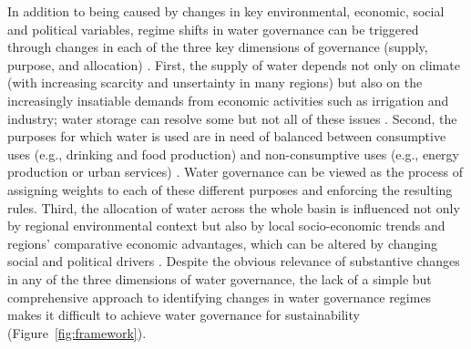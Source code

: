 In addition to being caused by changes in key environmental, economic, social and political variables, regime shifts in water governance can be triggered through changes in each of the three key dimensions of governance (supply, purpose, and allocation) %
\cite{undpwatergovernancefacilityWaterGovernanceIssue, mariajacobsonUserguideassessing2013, kjellenWatergovernanceperspective2015}.
First, the supply of water depends not only on climate (with increasing scarcity and unsertainty in many regions) but also on the increasingly insatiable demands from economic activities such as irrigation and industry; water storage can resolve some but not all of these issues
\cite{greveGlobalassessmentwater2018,wadaHumanwaterinterface2017,qinFlexibilityintensityglobal2019}.
Second, the purposes for which water is used are in need of balanced between consumptive uses (e.g., drinking and food production) and non-consumptive uses (e.g., energy production or urban services)
\cite{liuWaterscarcityassessments2017,florkeWatercompetitioncities2018,kleemannQuantifyinginterregionalflows2020}.
Water governance can be viewed as the process of assigning weights to each of these different purposes and enforcing the resulting rules.
Third, the allocation of water across the whole basin is influenced not only by regional environmental context but also by local socio-economic trends and regions’ comparative economic advantages, which can be altered by changing social and political drivers
\cite{roobavannanRoleSectoralTransformation2017,speedBasinwaterallocation2013}.
Despite the obvious relevance of substantive changes in any of the three dimensions of water governance, the lack of a simple but comprehensive approach to identifying changes in water governance regimes makes it difficult to achieve water governance for sustainability (Figure~\ref{fig:framework}).

